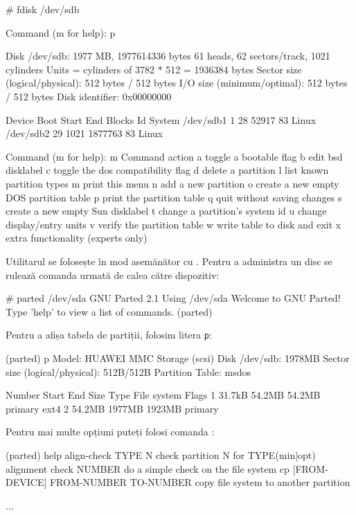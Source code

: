 \begin{screen}
# fdisk /dev/sdb


Command (m for help): p


Disk /dev/sdb: 1977 MB, 1977614336 bytes
61 heads, 62 sectors/track, 1021 cylinders
Units = cylinders of 3782 * 512 = 1936384 bytes
Sector size (logical/physical): 512 bytes / 512 bytes
I/O size (minimum/optimal): 512 bytes / 512 bytes
Disk identifier: 0x00000000


   Device Boot      Start         End      Blocks   Id  System
/dev/sdb1               1          28       52917   83  Linux
/dev/sdb2              29        1021     1877763   83  Linux


Command (m for help): m
Command action
   a   toggle a bootable flag
   b   edit bsd disklabel
   c   toggle the dos compatibility flag
   d   delete a partition
   l   list known partition types
   m   print this menu
   n   add a new partition
   o   create a new empty DOS partition table
   p   print the partition table
   q   quit without saving changes
   s   create a new empty Sun disklabel
   t   change a partition's system id
   u   change display/entry units
   v   verify the partition table
   w   write table to disk and exit
   x   extra functionality (experts only)
\end{screen}

Utilitarul  se folosește în mod asemănător cu . Pentru a
administra un disc se rulează comanda  urmată de calea către
dispozitiv:

\begin{screen}
# parted /dev/sda
GNU Parted 2.1
Using /dev/sda
Welcome to GNU Parted! Type 'help' to view a list of commands.
(parted)
\end{screen}

Pentru a afișa tabela de partiții, folosim litera \texttt{p}:

\begin{screen}
(parted) p
Model: HUAWEI MMC Storage (scsi)
Disk /dev/sdb: 1978MB
Sector size (logical/physical): 512B/512B
Partition Table: msdos


Number  Start   End     Size    Type     File system  Flags
 1      31.7kB  54.2MB  54.2MB  primary  ext4
 2      54.2MB  1977MB  1923MB  primary
\end{screen}

Pentru mai multe opțiuni puteți folosi comanda :

\begin{screen}
(parted) help
  align-check TYPE N                        check partition N for TYPE(min|opt) alignment
  check NUMBER                             do a simple check on the file system
  cp [FROM-DEVICE] FROM-NUMBER TO-NUMBER   copy file system to another partition


...
\end{screen}

